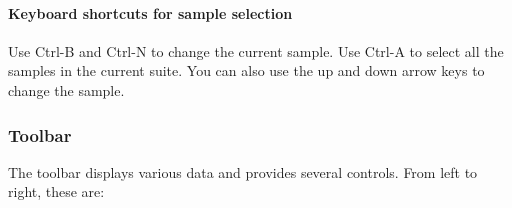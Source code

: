 \documentclass[a4paper,british]{article}
\newcommand{\ppcmd}[1]{\textsf{#1}} %
\begin{document}
\paragraph{Keyboard shortcuts for sample selection}

Use \ppcmd{Ctrl-B} and \ppcmd{Ctrl-N} to change the current sample. Use
\ppcmd{Ctrl-A} to select all the samples in the current suite. You can also
use the up and down arrow keys to change the sample.

\subsubsection{\label{sec:toolbar}Toolbar}

The toolbar displays various data and provides several controls.
From left to right, these are:
\end{document}
